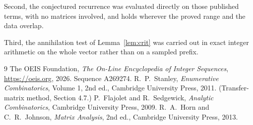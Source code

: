 \documentclass[11pt,a4paper]{article}
\theoremstyle{plain}
\theoremstyle{definition}
\begin{document}
Second, the conjectured recurrence was evaluated directly on those published terms, with no
matrices involved, and holds wherever the proved range and the data overlap.

Third, the annihilation test of Lemma~\ref{lem:crit} was carried out in exact integer
arithmetic on the whole vector rather than on a sampled prefix.

\begin{thebibliography}{9}
 The OEIS Foundation, \emph{The On-Line Encyclopedia of Integer
Sequences}, \url{https://oeis.org}, 2026. Sequence A269274.
 R.~P.~Stanley, \emph{Enumerative Combinatorics}, Volume 1, 2nd ed.,
Cambridge University Press, 2011. (Transfer-matrix method, Section 4.7.)
 P.~Flajolet and R.~Sedgewick, \emph{Analytic Combinatorics}, Cambridge
University Press, 2009.
 R.~A.~Horn and C.~R.~Johnson, \emph{Matrix Analysis}, 2nd ed., Cambridge
University Press, 2013.
\end{thebibliography}
\end{document}
